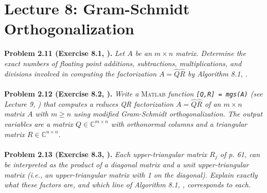 \documentclass[a4paper,oneside]{book}
\numberwithin{equation}{chapter}
\begin{document}
\section{Lecture 8: Gram-Schmidt Orthogonalization}
\textbf{Problem 2.11 (Exercise 8.1, \cite{1}).} \textit{Let $A$ be an $m\times n$ matrix. Determine the exact numbers of floating point additions, subtractions, multiplications, and divisions involved in computing the factorization $A=\hat Q\hat R$ by Algorithm 8.1, \cite{1}.}\\
\\
\textbf{Problem 2.12 (Exercise 8.2, \cite{1}).} \textit{Write a} \textsc{Matlab} \textit{ function \texttt{[Q,R] = mgs(A)} (see Lecture 9, \cite{1}) that computes a reduces QR factorization $A=\hat Q\hat R$ of an $m\times n$ matrix $A$ with $m\ge n$ using modified Gram-Schmidt orthogonalization. The output variables are a matrix $Q\in \mathbb{C}^{m\times n}$ with orthonormal columns and a triangular matrix $R\in \mathbb{C}^{n\times n}$.}\\
\\
\textbf{Problem 2.13 (Exercise 8.3, \cite{1}).} \textit{Each upper-triangular matrix $R_j$ of p. 61, \cite{1} can be interpreted as the product of a diagonal matrix and a unit upper-triangular matrix (i.e., an upper-triangular matrix with 1 on the diagonal). Explain exactly what these factors are, and which line of Algorithm 8.1, \cite{1}, corresponds to each.}
\end{document}
